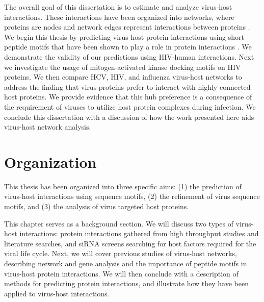 The overall goal of this dissertation is to estimate and analyze
virus-host interactions. These interactions have been organized into
networks, where proteins are nodes and network edges represent
interactions between proteins \cite{han04}. We begin this thesis by
predicting virus-host protein interactions using short peptide motifs
that have been shown to play a role in protein interactions
\cite{kadaveru08}. We demonstrate the validity of our predictions
using HIV-human interactions. Next we investigate the usage of
mitogen-activated kinase docking motifs on HIV proteins. We then
compare HCV, HIV, and influenza virus-host networks to address the
finding that virus proteins prefer to interact with highly connected
host proteins. We provide evidence that this hub preference is a
consequence of the requirement of viruses to utilize host protein
complexes during infection. We conclude this dissertation with a
discussion of how the work presented here aids virus-host network
analysis.

\section{Organization}
This thesis has been organized into three specific aims: (1) the
prediction of virus-host interactions using sequence motifs, (2) the
refinement of virus sequence motifs, and (3) the analysis of virus
targeted host proteins.

This chapter serves as a background section. We will discuss two types
of virus-host interactions: protein interactions gathered from high
throughput studies and literature searches, and siRNA screens
searching for host factors required for the viral life cycle. Next, we
will cover previous studies of virus-host networks, describing network
and gene analysis and the importance of peptide motifs in virus-host
protein interactions. We will then conclude  with a description
of methods for predicting protein interactions, and illustrate how
they have been applied to virus-host interactions.


